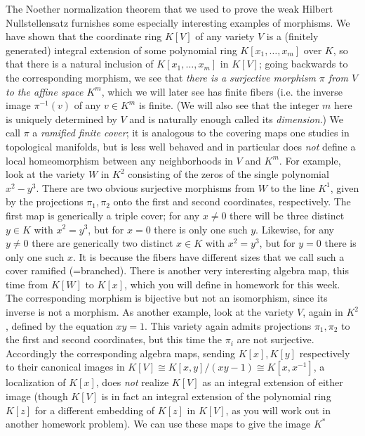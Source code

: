 \documentclass[10pt]{article}
\begin{document}
The Noether normalization theorem that we used to prove the weak Hilbert
Nullstellensatz furnishes some especially interesting examples of
morphisms. We have shown that the coordinate ring $K[V]$ of any variety
$V$ is a (finitely generated) integral extension of some polynomial ring
$K[x_1,\ldots,x_m]$ over $K$, so that there is a natural inclusion of
$K[x_1,\ldots,x_m]$ in $K[V]$; going backwards to the corresponding
morphism, we see that {\sl there is a surjective morphism $\pi$ from $V$
  to the affine space $K^m$}, which we will later see has finite fibers
(i.e. the inverse image $\pi^{-1}(v)$ of any $v\in K^m$ is finite. (We
will also see that the integer $m$ here is uniquely determined by $V$
and is naturally enough called its {\sl dimension}.) We call $\pi$ a
{\sl ramified finite cover}; it is analogous to the covering maps one
studies in topological manifolds, but is less well behaved and in
particular does {\sl not} define a local homeomorphism between any
neighborhoods in $V$ and $K^m$. For example, look at the variety $W$ in
$K^2$ consisting of the zeros of the single polynomial $x^2 - y^3$.
There are two obvious surjective morphisms from $W$ to the line $K^1$,
given by the projections $\pi_1,\pi_2$ onto the first and second
coordinates, respectively. The first map is generically a triple cover;
for any $x\ne 0$ there will be three distinct $y\in K$ with $x^2 = y^3$,
but for $x=0$ there is only one such $y$. Likewise, for any $y\ne0$
there are generically two distinct $x\in K$ with $x^2 = y^3$, but for
$y=0$ there is only one such $x$. It is because the fibers have
different sizes that we call such a cover ramified (=branched). There is
another very interesting algebra map, this time from $K[W]$ to $K[x]$,
which you will define in homework for this week. The corresponding
morphism is bijective but not an isomorphism, since its inverse is not a
morphism. As another example, look at the variety $V$, again in $K^2$,
defined by the equation $xy = 1$. This variety again admits projections
$\pi_1,\pi_2$ to the first and second coordinates, but this time the
$\pi_i$ are not surjective. Accordingly the corresponding algebra maps,
sending $K[x],K[y]$ respectively to their canonical images in $K[V]\cong
K[x,y]/(xy - 1)\cong K[x,x^{-1}]$, a localization of $K[x]$, does {\sl
  not} realize $K[V]$ as an integral extension of either image (though
$K[V]$ is in fact an integral extension of the polynomial ring $K[z]$
for a different embedding of $K[z]$ in $K[V]$, as you will work out in
another homework problem). We can use these maps to give the image $K^*$
\end{document}
